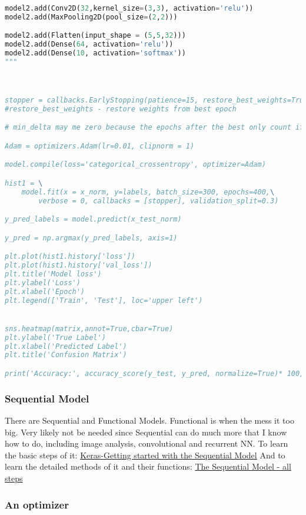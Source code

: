 \begin{lstlisting}[language = python]
model2.add(Conv2D(32,kernel_size=(3,3), activation='relu'))
model2.add(MaxPooling2D(pool_size=(2,2)))

model2.add(Flatten(input_shape = (5,5,32)))
model2.add(Dense(64, activation='relu'))
model2.add(Dense(10, activation='softmax'))
"""



stopper = callbacks.EarlyStopping(patience=15, restore_best_weights=True)
#restore_best_weights - restore weights from best epoch 

# min_delta may me zero because the epochs after the best only count if there's improvement

Adam = optimizers.Adam(lr=0.01, clipnorm = 1)

model.compile(loss='categorical_crossentropy', optimizer=Adam)

hist1 = \
    model.fit(x = x_norm, y=labels, batch_size=300, epochs=400,\
        verbose = 0, callbacks = [stopper], validation_split=0.3)

y_pred_labels = model.predict(x_test_norm)

y_pred = np.argmax(y_pred_labels, axis=1)

plt.plot(hist1.history['loss'])
plt.plot(hist1.history['val_loss'])
plt.title('Model loss')
plt.ylabel('Loss')
plt.xlabel('Epoch')
plt.legend(['Train', 'Test'], loc='upper left')


sns.heatmap(matrix,annot=True,cbar=True)
plt.ylabel('True Label')
plt.xlabel('Predicted Label')
plt.title('Confusion Matrix')

print('Accuracy:', accuracy_score(y_test, y_pred, normalize=True)* 100, '%')
\end{lstlisting}

\subsubsection{Sequential Model}
There are Sequential and Functional Models. Functional is when the mess it too big. Very likely not be needed since Sequential can do much more that I know how to do, including image analysis, convolutional and recurrent NN.
To learn the basic steps of it:
\href{https://keras.io/getting-started/sequential-model-guide/}{\ul{Keras-Getting started with the Sequential Model}}
And to learn the detailed methods of it and their functions:
\href{https://keras.io/models/sequential/}{\ul{The Sequential Model - all steps}}

\subsubsection{An optimizer}


